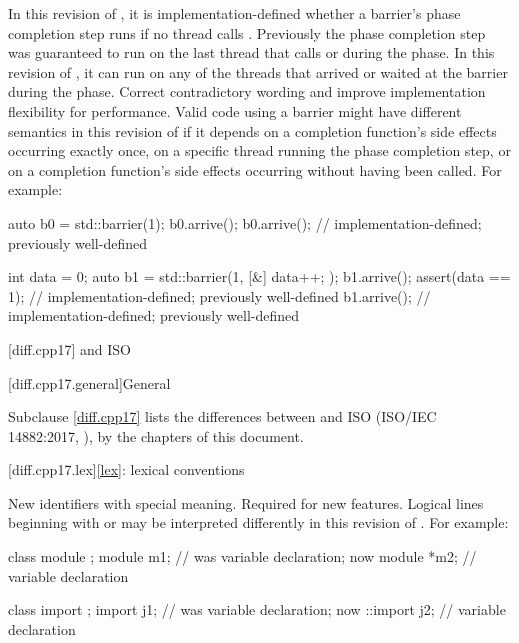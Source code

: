 \change
In this revision of \Cpp{},
it is implementation-defined whether a barrier's phase completion step runs
if no thread calls .
Previously the phase completion step was guaranteed to run on the last thread that calls  or  during the phase.
In this revision of \Cpp{},
it can run on any of the threads that arrived or waited at the barrier
during the phase.
\rationale
Correct contradictory wording and
improve implementation flexibility for performance.
\effect
Valid \CppXX{} code using a barrier might have
different semantics in this revision of \Cpp{}
if it depends on a completion function's side effects occurring exactly once,
on a specific thread running the phase completion step, or
on a completion function's side effects occurring
without  having been called.
For example:
\begin{codeblock}
auto b0 = std::barrier(1);
b0.arrive();
b0.arrive();            // implementation-defined; previously well-defined

int data = 0;
auto b1 = std::barrier(1, [&] { data++; });
b1.arrive();
assert(data == 1);      // implementation-defined; previously well-defined
b1.arrive();            // implementation-defined; previously well-defined
\end{codeblock}

[diff.cpp17]{\Cpp{} and ISO \CppXVII{}}

[diff.cpp17.general]{General}

\pnum
{}%
Subclause \ref{diff.cpp17} lists the differences between \Cpp{} and
ISO \CppXVII{} (ISO/IEC 14882:2017, ),
by the chapters of this document.

[diff.cpp17.lex]{\ref{lex}: lexical conventions}

\change
New identifiers with special meaning.
\rationale
Required for new features.
\effect
Logical lines beginning with
 or  may
be interpreted differently
in this revision of \Cpp{}.
For example:
\begin{codeblock}
class module {};
module m1;          // was variable declaration; now 
module *m2;         // variable declaration

class import {};
import j1;          // was variable declaration; now 
::import j2;        // variable declaration
\end{codeblock}

